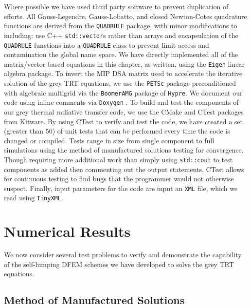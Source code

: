 Where possible we have used third party software to prevent duplication of  efforts.
All Gauss-Legendre, Gauss-Lobatto, and closed Newton-Cotes quadrature functions are derived from the \verb+QUADRULE+ \cite{quadrule} package, with minor modifications to including: use C++ \verb+std::vector+s rather than arrays and encapsulation of the \verb+QUADRULE+ functions into a \verb+QUADRULE+ class to prevent limit access and contamination the global name space.
We have directly implemented all of the matrix/vector based equations in this chapter, as written, using the \verb+Eigen+ linear algebra package\cite{eigen}.
To invert the MIP DSA matrix used to accelerate the iterative solution of the grey TRT equations, we use the \verb+PETSc+ package\cite{petsc} preconditioned with algebraic multigrid\cite{mip_mc} via the \verb+BoomerAMG+ package of \verb+Hypre+\cite{hypre}.
We document our code using  inline comments  via \verb+Doxygen+ \cite{doxygen}.
To build and test the components of our grey thermal radiative transfer code, we use the CMake and CTest packages from Kitware\cite{cmake}.
By using CTest to verify and test the code, we have created a set (greater than 50) of unit tests that can be performed every time the code is changed or compiled.
Tests range in size from single component to full simulations using the method of manufactured solutions\cite{mms} testing for convergence.
Though requiring more additional work than simply using \verb+std::cout+ to test components as added then commenting out the output statements, CTest allows for continuous testing to find bugs that the programmer would not otherwise suspect.
Finally, input parameters for the code are input an \verb+XML+ file, which we read using \verb+TinyXML+\cite{xml}. 

\section{Numerical Results}
\label{sec:chap6_results}

We now consider several test problems to verify and demonstrate the capability of the self-lumping DFEM schemes we have developed to solve the grey TRT equations.

\subsection{Method of Manufactured Solutions}

